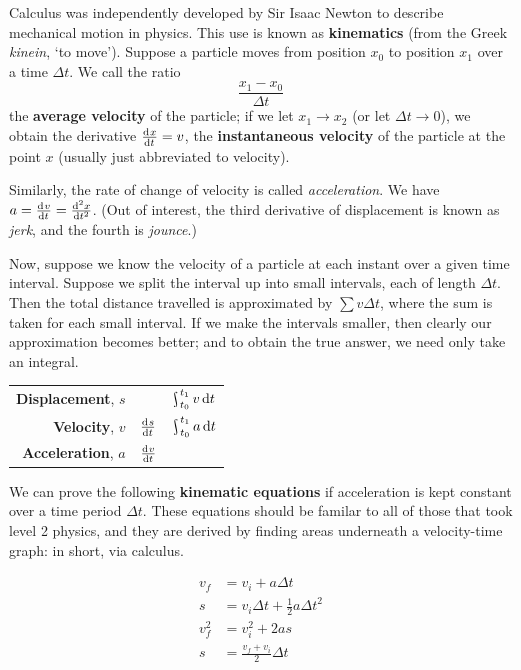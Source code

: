 


Calculus was independently developed by Sir Isaac Newton to describe mechanical motion in physics. This use is known as \textbf{kinematics} (from
the Greek \textit{kinein}, `to move'). Suppose a particle moves from position $ x_0 $ to position $ x_1 $ over a time $ \Delta t $. We call the ratio
\begin{displaymath}
  \frac{x_1 - x_0}{\Delta t}
\end{displaymath}
the \textbf{average velocity} of the particle; if we let $ x_1 \to x_2 $ (or let $ \Delta t \to 0 $), we obtain the derivative $ \od{x}{t} = v $, the
\textbf{instantaneous velocity} of the particle at the point $ x $ (usually just abbreviated to velocity).

Similarly, the rate of change of velocity is called \textit{acceleration}. We have $ a = \od{v}{t} = \od[2]{x}{t} $. (Out of interest, the third
derivative of displacement is known as \textit{jerk}, and the fourth is \textit{jounce}.)

Now, suppose we know the velocity of a particle at each instant over a given time interval. Suppose we split the interval up into small intervals,
each of length $ \Delta t $. Then the total distance travelled is approximated by $ \sum v \Delta t $, where the sum is taken for each small interval.
If we make the intervals smaller, then clearly our approximation becomes better; and to obtain the true answer, we need only take an integral.

\begin{center}
  \def\arraystretch{1.5}
  \begin{tabular}{|rcc|}\hline
    \textbf{Displacement}, $ s $ && $\rint_{t_0}^{t_1} v \dif{t} $\\
    \textbf{Velocity}, $ v $ & $ \od{s}{t} $ & $ \rint_{t_0}^{t_1} a \dif{t} $\\
    \textbf{Acceleration}, $ a $ & $ \od{v}{t} $ &\\\hline
  \end{tabular}
\end{center}

We can prove the following \textbf{kinematic equations} if acceleration is kept constant over a time period $ \Delta t $. These equations
should be familar to all of those that took level 2 physics, and they are derived by finding areas underneath a velocity-time graph: in
short, via calculus.

\begin{align*}
  v_f &= v_i + a \Delta t\\
  s &= v_i \Delta t + \frac{1}{2} a {\Delta t}^2\\
  v_f^2 &= v_i^2 + 2a s\\
  s &= \frac{v_f + v_i}{2} \Delta t
\end{align*}

